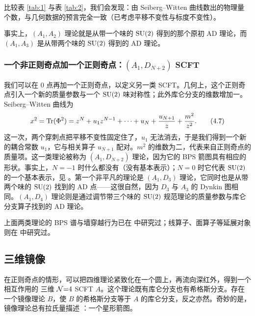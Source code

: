 
比较表 \ref{tab:1} 与表 \ref{tab:2}，我们会发现：由 Seiberg--Witten 曲线数出的物理量个数，与几何数据的预言完全一致（已考虑平移不变性与标度不变性）。

事实上，$(A_1,A_2)$ 理论就是从带一个味的 $\operatorname{SU}(2)$ 得到的那个原初 AD 理论，而 $(A_1,A_3)$ 是从带两个味的 $\operatorname{SU}(2)$ 得到的 AD 理论。

\subsubsection{一个非正则奇点加一个正则奇点：$(A_1,D_{N+2})$ SCFT}
\label{sec:4.1.2}

我们可以在 $0$ 点再加一个正则奇点，以定义另一类 SCFT。几何上，这个正则奇点引入一个新的质量参数与一个 $\operatorname{SU}(2)$ 味对称性；此外库仑分支的维数增加一。Seiberg--Witten 曲线为
\begin{equation}
x^2 = \operatorname{Tr}(\Phi^2) = z^N + u_1 z^{N-1} + \cdots + u_N + \frac{u_{N+1}}{z} + \frac{m^2}{z^2}.
\label{eq:4.7}\tag{4.7}
\end{equation}
这一次，两个穿刺点把平移不变性固定住了，$u_1$ 无法消去，于是我们得到一个新的耦合常数 $u_1$，它与相关算子 $u_{N+1}$ 配对。$m^2$ 的维数为二，代表来自正则奇点的质量项。这一类理论被称为 $(A_1,D_{N+2})$ 理论，因为它的 BPS 箭图具有相应的形状。事实上，$N=-1$ 时什么都没有（没有基本表示）；$N=0$ 时它代表 $\operatorname{SU}(2)$ 的一个基本表示，见 \cite{3,32}。第一个非平凡的理论是 $(A_1,D_3)$ 理论，它同时也是从带两个味的 $\operatorname{SU}(2)$ 找到的 AD 点——这很自然，因为 $D_3$ 与 $A_3$ 的 Dynkin 图相同。$(A_1,D_4)$ 理论则是通过调节带三个味的 $\operatorname{SU}(2)$ 规范理论的质量参数与库仑分支算子找到的 AD 理论。

上面两类理论的 BPS 谱与墙穿越行为已在 \cite{3,33,34,35} 中研究过；线算子、面算子等延展对象则在 \cite{36,37} 中研究过。

\subsection{三维镜像}
\label{sec:4.2}

在正则奇点的情形，可以把四维理论紧致化在一个圆上，再流向深红外，得到一个相互作用的 三维 $\mathcal{N}{=}4$ SCFT $A$。这个理论既有库仑分支也有希格斯分支。存在一个镜像理论 $B$，使 $B$ 的希格斯分支等于 $A$ 的库仑分支，反之亦然。奇妙的是，镜像理论总有拉氏量描述 \cite{38}：一个星形箭图。

